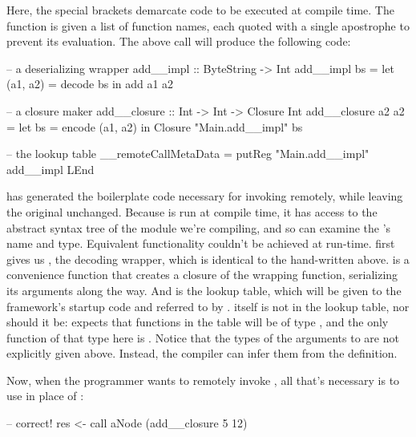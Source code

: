 \documentclass[preprint]{sigplanconf}
\begin{document}

Here, the special brackets \textt{\$( )} demarcate code to be executed at compile time. The  function is given a list of function names, each quoted with a single apostrophe to prevent its evaluation. The above  call will produce the following code:

\begin{code}
-- a deserializing wrapper
add__impl :: ByteString -> Int
add__impl bs =
  let (a1, a2) = decode bs
   in add a1 a2

-- a closure maker
add__closure :: Int -> Int -> Closure Int
add__closure a2 a2 = 
  let bs = encode (a1, a2)
   in Closure "Main.add__impl" bs

-- the lookup table
__remoteCallMetaData = 
  putReg "Main.add__impl" add__impl LEnd
\end{code}

 has generated the boilerplate code necessary for invoking  remotely, while leaving the original  unchanged. Because  is run at compile time, it has access to the abstract syntax tree of the module we're compiling, and so can examine the 's name and type. Equivalent functionality couldn't be achieved at run-time.  first gives us , the decoding wrapper, which is identical to the hand-written  above.  is a convenience function that creates a closure of the wrapping function, serializing its arguments along the way. And  is the lookup table, which will be given to the framework's startup code and referred to by .  itself is not in the lookup table, nor should it be:  expects that functions in the table will be of type , and the only function of that type here is . Notice that the types of the arguments to  are not explicitly given above. Instead, the compiler can infer them from the definition.

Now, when the programmer wants to remotely invoke , all that's necessary is to use  in place of :

\begin{code}
-- correct!
res <- call aNode (add__closure 5 12)
\end{code}
\end{document}
